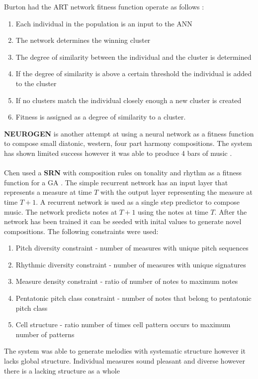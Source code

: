 Burton had the \ac{ART} network fitness function operate as follows \cite{Burton97geneticalgorithm}:
\begin{enumerate}
\item Each individual in the population is an input to the \ac{ANN}
\item The network determines the winning cluster
\item The degree of similarity between the individual and the cluster is determined
\item If the degree of similarity is above a certain threshold the individual is added to the cluster
\item If no clusters match the individual closely enough a new cluster is created
\item Fitness is assigned as a degree of similarity to a cluster. 
\end{enumerate}

\textbf{NEUROGEN} is another attempt at using a neural network as a fitness function to compose small diatonic, western, four part harmony compositions.
The system has shown limited success however it was able to produce 4 bars of music \cite{gibson1991neurogen}.
\\
\\
Chen used a \textbf{\ac{SRN}} with composition rules on tonality and rhythm as a fitness function for a \ac{GA} \cite{Chen2001}. The simple recurrent network has an input layer that represents a measure at time $T$ with the output layer representing the measure at time $T+1$.
A recurrent network is used as a single step predictor to compose music. The network predicts notes at $T+1$ using the notes at time $T$. After the network has been trained it can be seeded with inital values to generate novel compositions.
The following constraints were used:
\begin{enumerate}
\item Pitch diversity constraint - number of measures with unique pitch sequences
\item Rhythmic diversity constraint - number of measures with unique signatures
\item Measure density constraint - ratio of number of notes to maximum notes
\item Pentatonic pitch class constraint - number of notes that belong to pentatonic pitch class
\item Cell structure - ratio number of times cell pattern occurs to maximum number of patterns 
\end{enumerate}
The system was able to generate melodies with systematic structure however it lacks global structure. Individual measures sound pleasant and diverse however there is a lacking structure as a whole

